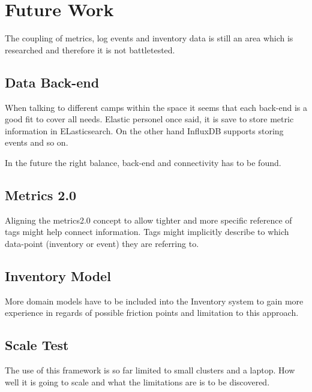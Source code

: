 \section{Future Work}

The coupling of metrics, log events and inventory data is still an area which is researched and therefore it is not battletested.

\subsection{Data Back-end}
When talking to different camps within the space it seems that each back-end is a good fit to cover all needs.
Elastic personel once said, it is save to store metric information in ELasticsearch. On the other hand InfluxDB supports storing events and so on.

In the future the right balance, back-end and connectivity has to be found.

\subsection{Metrics 2.0}
Aligning the metrics2.0 concept to allow tighter and more specific reference of tags might help connect information.
Tags might implicitly describe to which data-point (inventory or event) they are referring to.

\subsection{Inventory Model}
More domain models have to be included into the Inventory system to gain more experience in regards of possible friction points and limitation to this approach.

\subsection{Scale Test}
The use of this framework is so far limited to small clusters and a laptop. How well it is going to scale and what the limitations are is to be discovered.
